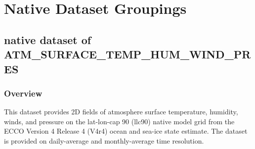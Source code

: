 \section{Native Dataset Groupings}
\subsection{native dataset of ATM\_SURFACE\_TEMP\_HUM\_WIND\_PRES}
\newp
\subsubsection{Overview}
This dataset provides 2D fields of atmosphere surface temperature, humidity, winds, and pressure on the lat-lon-cap 90 (llc90) native model grid from the ECCO Version 4 Release 4 (V4r4) ocean and sea-ice state estimate. The dataset is provided on daily-average and monthly-average time resolution.
\\\\
